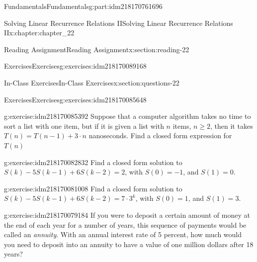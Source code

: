 \documentclass[oneside,10pt,]{book}
\numberwithin{equation}{section}
\begin{document}
\begin{partptx}{Fundamentals}{}{Fundamentals}{}{}{g:part:idm218170761696}
\begin{chapterptx}{Solving Linear Recurrence Relations II}{}{Solving Linear Recurrence Relations II}{}{}{x:chapter:chapter_22}
\begin{sectionptx}{Reading Assignment}{}{Reading Assignment}{}{}{x:section:reading-22}
\begin{exercises-subsection-numberless}{Exercises}{}{Exercises}{}{}{g:exercises:idm218170089168}
\par\medskip\noindent
\end{exercises-subsection-numberless}
\end{sectionptx}
%
%
\typeout{************************************************}
\typeout{************************************************}
%
\begin{sectionptx}{In-Class Exercises}{}{In-Class Exercises}{}{}{x:section:questions-22}
%
%
%
\typeout{************************************************}
\typeout{************************************************}
%
\begin{exercises-subsection-numberless}{Exercises}{}{Exercises}{}{}{g:exercises:idm218170085648}
\par\medskip\noindent%
%
\begin{exercisegroup}
\begin{divisionexerciseeg}{1}{}{}{g:exercise:idm218170085392}%
Suppose that a computer algorithm takes no time to sort a list with one item, but if it is given a list with \(n\) items, \(n \geq 2\), then it takes \(T(n) = T(n-1) + 3\cdot n\) nanoseconds.  Find a closed form expression for \(T(n)\)%
\end{divisionexerciseeg}%
\begin{divisionexerciseeg}{2}{}{}{g:exercise:idm218170082832}%
Find a closed form solution to \(S(k) - 5S(k - 1) + 6S(k - 2) = 2\), with \(S(0) = -1\), and \(S(1) = 0\).%
\end{divisionexerciseeg}%
\begin{divisionexerciseeg}{3}{}{}{g:exercise:idm218170081008}%
Find a closed form solution to \(S(k) - 5S(k - 1) + 6S(k - 2) = 7 \cdot 3^k\), with \(S(0) = 1\), and \(S(1) = 3\).%
\end{divisionexerciseeg}%
\begin{divisionexerciseeg}{4}{}{}{g:exercise:idm218170079184}%
If you were to deposit a certain amount of money at the end of each year for a number of years, this sequence of payments would be called an \emph{annuity}.  With an annual interest rate of 5 percent, how much would you need to deposit into an annuity to have a value of one million dollars after 18 years?%
\end{divisionexerciseeg}%
\end{exercisegroup}
\par\medskip\noindent
\end{exercises-subsection-numberless}
\end{sectionptx}

\end{chapterptx}
\end{partptx}
\end{document}
